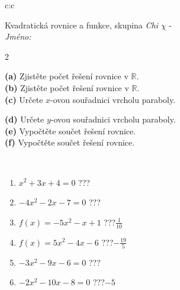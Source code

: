 \documentclass[10pt]{report}
\begin{document}
\begin{tabular}{c:c}
\begin{minipage}[c][104.5mm][t]{0.5\linewidth}
\begin{center}
\vspace{7mm}
{\huge \LARGE Kvadratická rovnice a funkce, skupina \textit{Chi $\chi$} -}\\[5mm]
\textit{Jméno:}\phantom{xxxxxxxxxxxxxxxxxxxxxxxxxxxxxxxxxxxxxxxxxxxxxxxxxxxxxxxxxxxxxxxxx}\\[5mm]
\begin{minipage}{0.95\linewidth}
\begin{center}
{\small \begin{multicols}{2} \raggedright
\textbf{(a)} Zjistěte počet řešení rovnice v \(\mathbb{R}\). \\[1mm]
\textbf{(b)} Zjistěte počet řešení rovnice v \(\mathbb{R}\). \\[1mm]
\textbf{(c)} Určete \(x\)-ovou souřadnici vrcholu paraboly. \par \columnbreak
\textbf{(d)} Určete \(y\)-ovou souřadnici vrcholu paraboly. \\[1mm]
\textbf{(e)} Vypočtěte součet řešení rovnice. \\[1mm]
\textbf{(f)} Vypočtěte součet řešení rovnice.
\end{multicols}
}
\end{center}
\end{minipage}
\\[4mm]
\begin{minipage}{0.79\linewidth}
\begin{center}
\begin{varwidth}{\linewidth}
\begin{enumerate}
\Large
\item $x^2+3x+4=0$\quad \dotfill\; ???\;\dotfill {}
\item $-4x^2-2x-7=0$\quad \dotfill\; ???\;\dotfill {}
\item $f(x)=-5x^2-x+1$\quad \dotfill\; ???\;\dotfill \quad $\frac{1}{10}$
\item $f(x)=5x^2-4x-6$\quad \dotfill\; ???\;\dotfill \quad $-\frac{19}{5}$
\item $-3x^2-9x-6=0$\quad \dotfill\; ???\;\dotfill {}
\item $-2x^2-10x-8=0$\quad \dotfill\; ???\;\dotfill \quad $-5$
\end{enumerate}
\end{varwidth}
\end{center}
\end{minipage}

\end{center}
\end{minipage}
\end{tabular}
\end{document}

